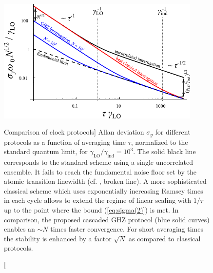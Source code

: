 \begin{figure}
\centering  
\includegraphics[width=0.9\textwidth]{./figs_Kessler2014/fig1.pdf}
\caption
[Comparison of clock protocols] 
{
\label{fig:sigma_tau}
Allan deviation $\sigma_y$ for different protocols as a function of averaging
time $\tau$, normalized to the standard quantum limit, for $\gamma_\mathrm{LO} /
\gamma_\mathrm{ind} = 10^3$. The solid black line corresponds to the standard scheme using
a single uncorrelated ensemble. It fails to reach the fundamental noise floor
set by the atomic transition linewidth (cf. , broken line).
A more sophisticated classical scheme which uses exponentially increasing Ramsey
times in each cycle \cite{Rosenband2013, Borregaard2013} allows to extend the
regime of linear scaling with $1/\tau$ up to the point where the bound
(\ref{eq:sigma(2)}) is met. In comparison, the proposed cascaded GHZ protocol
(blue solid curves) enables an $\sim N$ times faster convergence. For short
averaging times the stability is enhanced by a factor $\sqrt{N}$ as compared to
classical protocols.
}
\end{figure} 


